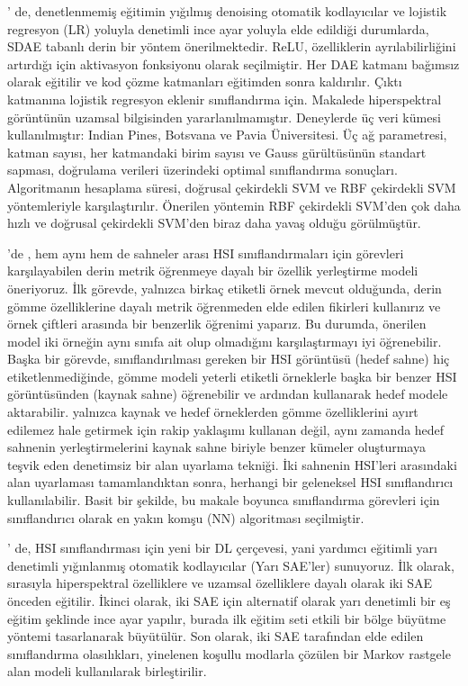 \citep{xing2016stacked}' de, denetlenmemiş eğitimin yığılmış denoising otomatik kodlayıcılar ve lojistik regresyon (LR) yoluyla denetimli ince ayar yoluyla elde edildiği durumlarda, SDAE tabanlı derin bir yöntem önerilmektedir. ReLU, özelliklerin ayrılabilirliğini artırdığı için aktivasyon fonksiyonu olarak seçilmiştir. Her DAE katmanı bağımsız olarak eğitilir ve kod çözme katmanları eğitimden sonra kaldırılır. Çıktı katmanına lojistik regresyon eklenir sınıflandırma için. Makalede hiperspektral görüntünün uzamsal bilgisinden yararlanılmamıştır. Deneylerde üç veri kümesi kullanılmıştır: Indian Pines, Botsvana ve Pavia Üniversitesi. Üç ağ parametresi, katman sayısı, her katmandaki birim sayısı ve Gauss gürültüsünün standart sapması, doğrulama verileri üzerindeki optimal sınıflandırma sonuçları.
Algoritmanın hesaplama süresi, doğrusal çekirdekli SVM ve RBF çekirdekli SVM yöntemleriyle karşılaştırılır.
Önerilen yöntemin RBF çekirdekli SVM'den çok daha hızlı ve doğrusal çekirdekli SVM'den biraz daha yavaş olduğu görülmüştür.


\citep{deng2019deep}'de , hem aynı hem de sahneler arası HSI sınıflandırmaları için görevleri karşılayabilen derin metrik öğrenmeye dayalı bir özellik yerleştirme modeli öneriyoruz. İlk görevde, yalnızca birkaç etiketli örnek mevcut olduğunda, derin gömme özelliklerine dayalı metrik öğrenmeden elde edilen fikirleri kullanırız ve örnek çiftleri arasında bir benzerlik öğrenimi yaparız. Bu durumda, önerilen model iki örneğin aynı sınıfa ait olup olmadığını karşılaştırmayı iyi öğrenebilir. Başka bir görevde, sınıflandırılması gereken bir HSI görüntüsü (hedef sahne) hiç etiketlenmediğinde, gömme modeli yeterli etiketli örneklerle başka bir benzer HSI görüntüsünden (kaynak sahne) öğrenebilir ve ardından kullanarak hedef modele aktarabilir. yalnızca kaynak ve hedef örneklerden gömme özelliklerini ayırt edilemez hale getirmek için rakip yaklaşımı kullanan değil, aynı zamanda hedef sahnenin yerleştirmelerini kaynak sahne biriyle benzer kümeler oluşturmaya teşvik eden denetimsiz bir alan uyarlama tekniği. İki sahnenin HSI'leri arasındaki alan uyarlaması tamamlandıktan sonra, herhangi bir geleneksel HSI sınıflandırıcı kullanılabilir. Basit bir şekilde, bu makale boyunca sınıflandırma görevleri için sınıflandırıcı olarak en yakın komşu (NN) algoritması seçilmiştir.


\citep{zhou2019semisupervised}' de, HSI sınıflandırması için yeni bir DL çerçevesi, yani yardımcı eğitimli yarı denetimli yığınlanmış otomatik kodlayıcılar (Yarı SAE'ler) sunuyoruz. İlk olarak, sırasıyla hiperspektral özelliklere ve uzamsal özelliklere dayalı olarak iki SAE önceden eğitilir. İkinci olarak, iki SAE için alternatif olarak yarı denetimli bir eş eğitim şeklinde ince ayar yapılır, burada ilk eğitim seti etkili bir bölge büyütme yöntemi tasarlanarak büyütülür. Son olarak, iki SAE tarafından elde edilen sınıflandırma olasılıkları, yinelenen koşullu modlarla çözülen bir Markov rastgele alan modeli kullanılarak birleştirilir.

\citep{kamilaris2018deep}
